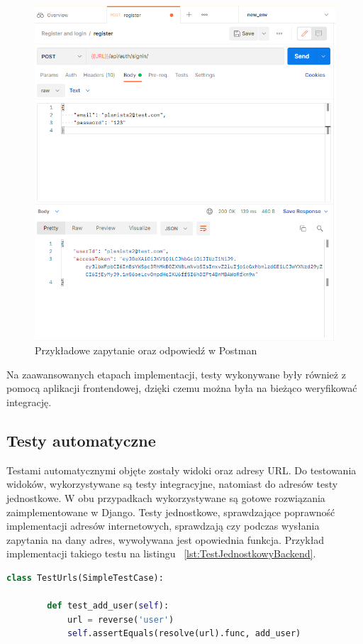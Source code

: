 \begin{figure}[H]
	\centering\includegraphics[width=\textwidth]{figures/postman1}
	\caption{Przykładowe zapytanie oraz odpowiedź w Postman}\label{rys:postman}
\end{figure}

Na zaawansowanych etapach implementacji, testy wykonywane były również z pomocą aplikacji frontendowej, dzięki czemu można była na bieżąco weryfikować integrację.

\subsection{Testy automatyczne}
Testami automatycznymi objęte zostały widoki oraz adresy URL. Do testowania widoków, wykorzystywane są testy integracyjne, natomiast do adresów testy jednostkowe. W obu przypadkach wykorzystywane są gotowe rozwiązania zaimplementowane w Django. Testy jednostkowe, sprawdzające poprawność implementacji adresów internetowych, sprawdzają czy podczas wysłania zapytania na dany adres, wywoływana jest opowiednia funkcja. Przykład implementacji takiego testu na listingu ~\ref{lst:TestJednostkowyBackend}.

\begin{lstlisting}[language=Python, caption=Implementacja przykładowego testu jednostkowego, label={lst:TestJednostkowyBackend}]
	class TestUrls(SimpleTestCase):
	
		def test_add_user(self):
			url = reverse('user')
			self.assertEquals(resolve(url).func, add_user)
\end{lstlisting}


